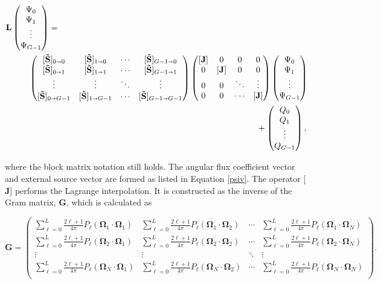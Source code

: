 \documentclass{article} %
\newcommand{\sa}{\shortrightarrow}
\newcommand{\bo}{\mathbf\Omega}
\newcommand{\ve}[1]{\ensuremath{\mathbf{#1}}}
\newcommand{\Gij}[2]{\sum_{\ell=0}^L\frac{2\ell+1}{4\pi}P_{\ell}(\bo_#1\cdot\bo_#2)}
\newcommand{\fq}{\qquad\qquad\qquad\qquad}
\newcommand{\st}{\tilde{S}}
\begin{document}
\begin{align}
    \ve{L}
    &\begin{pmatrix}
      \Psi_0 \\
      \Psi_1 \\
      \vdots   \\
      \Psi_{G-1}  \nonumber
    \end{pmatrix} = \\
    &\qquad\begin{pmatrix}
      [\ve{\st}]_{0\sa 0}   & [\ve{\st}]_{1\sa0}    & \cdots & [\ve{\st}]_{G-1\sa0} \\
      [\ve{\st}]_{0\sa 1}   & [\ve{\st}]_{1\sa1}    & \cdots & [\ve{\st}]_{G-1\sa1} \\
      \vdots                & \vdots                & \ddots & \vdots               \\
      [\ve{\st}]_{0\sa G-1} & [\ve{\st}]_{1\sa G-1} & \cdots & [\ve{\st}]_{G-1 \sa G-1}
    \end{pmatrix}
    \begin{pmatrix}
      [\ve{J}] & 0 & 0 & 0 \\
      0 & [\ve{J}] & 0 & 0 \\
      0 & 0 & \ddots & \vdots \\
      0 & 0 & \cdots & [\ve{J}] \\
    \end{pmatrix}
    \begin{pmatrix}
      \Psi_0 \\
      \Psi_1 \\
      \vdots   \\
      \Psi_{G-1}
    \end{pmatrix}
    \\&\fq\fq\fq\qquad\qquad\quad+
    \begin{pmatrix}
      Q_0 \\
      Q_1 \\
      \vdots  \\
      Q_{G-1} \nonumber
    \end{pmatrix},
\end{align}

\noindent where the block matrix notation still holds. The angular flux
coefficient vector and external source vector are formed as listed in Equation
\ref{psiv}. The operator [$\ve{J}$] performs the Lagrange interpolation. It is
constructed as the inverse of the Gram matrix, $\ve{G}$, which is calculated as

\begin{equation}
  \ve{G} = \begin{pmatrix}
    \Gij{1}{1} & \Gij{1}{2} & \cdots & \Gij{1}{N} \\
    \Gij{2}{1} & \Gij{2}{2} & \cdots & \Gij{2}{N} \\
    \vdots     & \vdots     & \ddots & \vdots     \\
    \Gij{N}{1} & \Gij{N}{2} & \cdots & \Gij{N}{N} \\
  \end{pmatrix}.
\label{gram}
\end{equation}
\end{document}
